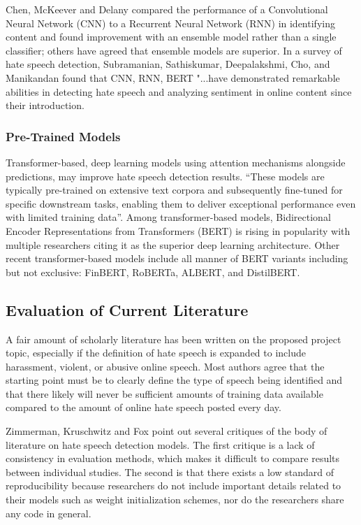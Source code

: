 \documentclass[conference]{IEEEtran}
\begin{document}
Chen, McKeever and Delany\cite{b11} compared the performance of a Convolutional Neural Network (CNN) to a Recurrent Neural Network (RNN) in identifying content and found improvement with an ensemble model rather than a single classifier; others have agreed that ensemble models are superior\cite{b11}. In a survey of hate speech detection, Subramanian, Sathiskumar, Deepalakshmi, Cho, and Manikandan found that CNN, RNN, BERT "...have demonstrated remarkable abilities in detecting hate speech and analyzing sentiment in online content since their introduction\cite{b17}. 

\subsubsection{Pre-Trained Models}
Transformer-based, deep learning models using attention mechanisms alongside predictions, may improve hate speech detection results. “These models are typically pre-trained on extensive text corpora and subsequently fine-tuned for specific downstream tasks, enabling them to deliver exceptional performance even with limited training data”\cite{b12}. Among transformer-based models, Bidirectional Encoder Representations from Transformers (BERT) is rising in popularity with multiple researchers citing it as the superior deep learning architecture\cite{b10}. Other recent transformer-based models include all manner of BERT variants including but not exclusive: FinBERT, RoBERTa, ALBERT, and DistilBERT\cite{b18}. 

\subsection{Evaluation of Current Literature}
A fair amount of scholarly literature has been written on the proposed project topic, especially if the definition of hate speech is expanded to include harassment, violent, or abusive online speech. Most authors agree that the starting point must be to clearly define the type of speech being identified and that there likely will never be sufficient amounts of training data available compared to the amount of online hate speech posted every day. 

Zimmerman, Kruschwitz and Fox\cite{b19} point out several critiques of the body of literature on hate speech detection models. The first critique is a lack of consistency in evaluation methods, which makes it difficult to compare results between individual studies\cite{b11}. The second is that there exists a low standard of reproducibility because researchers do not include important details related to their models such as weight initialization schemes, nor do the researchers share any code in general. 
\end{document}
